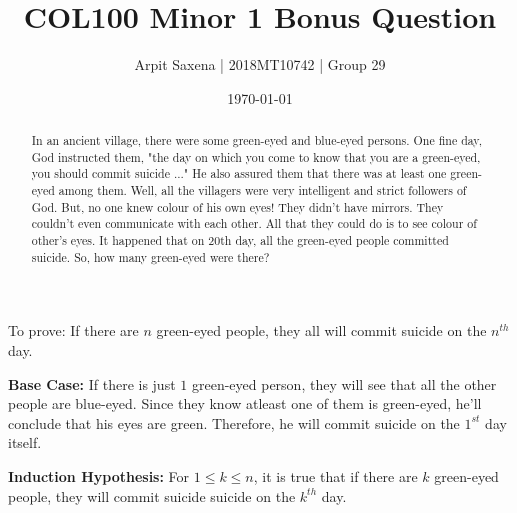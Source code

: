 \documentclass{article}
\begin{document}
    \title{COL100 Minor 1 Bonus Question}
    \author{Arpit Saxena | 2018MT10742 | Group 29}
    \date{\today}
    \maketitle
    

    \begin{abstract}
        In an ancient village, there were some green-eyed and blue-eyed persons. One fine day, God instructed them,
        "the day on which you come to know that you are a green-eyed, you should commit suicide ..." He also assured
        them that there was at least one green-eyed among them. Well, all the villagers were very intelligent and
        strict followers of God. But, no one knew colour of his own eyes! They didn't have mirrors. They couldn't
        even communicate with each other. All that they could do is to see colour of other's eyes. It happened that
        on 20th day, all the green-eyed people committed suicide. So, how many green-eyed were there?
    \end{abstract}

    {To prove:}
    If there are $n$ green-eyed people, they all will commit suicide on the $n^{th}$ day.
    

    \textbf{Base Case:}
    If there is just $1$ green-eyed person, they will see that all the other people are blue-eyed. Since they know
    atleast one of them is green-eyed, he'll conclude that his eyes are green. Therefore, he will commit suicide on
    the $1^{st}$ day itself.
    
    \textbf{Induction Hypothesis:}
    For $1 \leq k \leq n$, it is true that if there are $k$ green-eyed people, they will commit suicide suicide
    on the $k^{th}$ day.     
\end{document}
